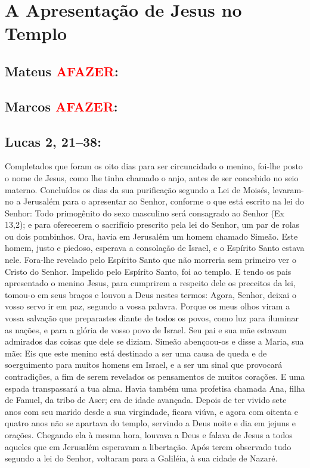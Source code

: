 \documentclass[10pt,a5paper]{book}
\newcommand{\from}[1]{\subsection*{#1}}
\newcommand{\TODO}{\textcolor{red}{\ttfamily AFAZER}}
\begin{document}

\section{A Apresentação de Jesus no Templo}

\from{Mateus \TODO:}

\from{Marcos \TODO:}

\from{Lucas 2, 21--38:}

Completados que foram os oito dias para ser circuncidado o menino, foi-lhe posto o nome de Jesus, como lhe tinha chamado o anjo, antes de ser concebido no seio materno.
Concluídos os dias da sua purificação segundo a Lei de Moisés, levaram-no a Jerusalém para o apresentar ao Senhor,
conforme o que está escrito na lei do Senhor: Todo primogênito do sexo masculino será consagrado ao Senhor (Ex 13,2);
e para oferecerem o sacrifício prescrito pela lei do Senhor, um par de rolas ou dois pombinhos.
Ora, havia em Jerusalém um homem chamado Simeão. Este homem, justo e piedoso, esperava a consolação de Israel, e o Espírito Santo estava nele.
Fora-lhe revelado pelo Espírito Santo que não morreria sem primeiro ver o Cristo do Senhor.
Impelido pelo Espírito Santo, foi ao templo. E tendo os pais apresentado o menino Jesus, para cumprirem a respeito dele os preceitos da lei,
tomou-o em seus braços e louvou a Deus nestes termos:
Agora, Senhor, deixai o vosso servo ir em paz, segundo a vossa palavra.
Porque os meus olhos viram a vossa salvação
que preparastes diante de todos os povos,
como luz para iluminar as nações, e para a glória de vosso povo de Israel.
Seu pai e sua mãe estavam admirados das coisas que dele se diziam.
Simeão abençoou-os e disse a Maria, sua mãe: Eis que este menino está destinado a ser uma causa de queda e de soerguimento para muitos homens em Israel, e a ser um sinal que provocará contradições,
a fim de serem revelados os pensamentos de muitos corações. E uma espada transpassará a tua alma.
Havia também uma profetisa chamada Ana, filha de Fanuel, da tribo de Aser; era de idade avançada.
Depois de ter vivido sete anos com seu marido desde a sua virgindade, ficara viúva, e agora com oitenta e quatro anos não se apartava do templo, servindo a Deus noite e dia em jejuns e orações.
Chegando ela à mesma hora, louvava a Deus e falava de Jesus a todos aqueles que em Jerusalém esperavam a libertação.
Após terem observado tudo segundo a lei do Senhor, voltaram para a Galiléia, à sua cidade de Nazaré.
\end{document}
